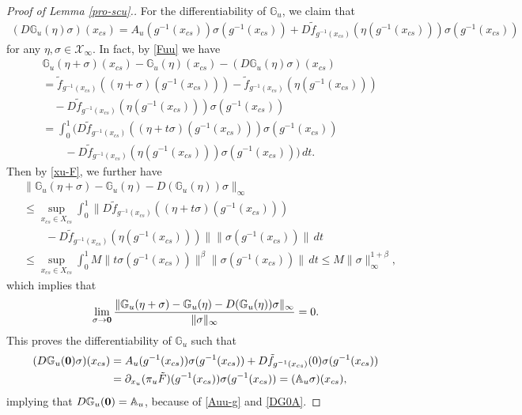 \documentclass[reqno]{amsart}
\numberwithin{equation}{section}
\begin{document}
\begin{proof}[Proof of Lemma {\rm \ref{pro-scu}}.]
For the differentiability of $\mathbb{G}_u$, we claim that
\begin{align*}
(D\mathbb{G}_u(\eta)\sigma) (x_{cs})
=A_u(g^{-1}(x_{cs}))\sigma(g^{-1}(x_{cs}))
+ D\tilde{f}_{g^{-1}(x_{cs})}(\eta(g^{-1}(x_{cs}))) \sigma(g^{-1}(x_{cs}))
\end{align*}
for any $\eta,\sigma\in \mathcal{X}_\infty$.
In fact, by \eqref{Fuu} we have
\begin{align*}
&\mathbb{G}_u(\eta+\sigma)(x_{cs}) - \mathbb{G}_u(\eta)(x_{cs}) -(D\mathbb{G}_u(\eta)\sigma)(x_{cs})
\\
& = \tilde{f}_{g^{-1}(x_{cs})}((\eta+\sigma)(g^{-1}(x_{cs})) ) - \tilde{f}_{g^{-1}(x_{cs})}(   \eta(g^{-1}(x_{cs})) )
\\
&\quad  - D\tilde{f}_{g^{-1}(x_{cs})}(\eta(g^{-1}(x_{cs}))) \sigma(g^{-1}(x_{cs}))
\\
& =\int_0^1 \Big( D\tilde{f}_{g^{-1}(x_{cs})}((\eta+t\sigma)(g^{-1}(x_{cs}))) \sigma(g^{-1}(x_{cs}))
\\
&\qquad  - D\tilde{f}_{g^{-1}(x_{cs})}(\eta(g^{-1}(x_{cs})))
    \sigma(g^{-1}(x_{cs})) \Big) \, dt.
\end{align*}
Then by  \eqref{xu-F}, we further have
\begin{align*}
&\| \mathbb{G}_u(\eta+\sigma) - \mathbb{G}_u(\eta) - D(\mathbb{G}_u(\eta))\sigma \|_\infty
\\
&\le \sup_{x_{cs}\in X_{cs}} \int_0^1
\big\| D\tilde{f}_{g^{-1}(x_{cs})}( (\eta+t\sigma)(g^{-1}(x_{cs})))
\\
&\qquad - D\tilde{f}_{g^{-1}(x_{cs})}(\eta(g^{-1}(x_{cs}))) \big\| \| \sigma(g^{-1}(x_{cs})) \|  \, dt
\\
&\le \sup_{x_{cs}\in X_{cs}} \int_0^1 M \|t \sigma(g^{-1}(x_{cs})) \|^{\beta}   \| \sigma(g^{-1}(x_{cs})) \|  \, dt \le M \|\sigma\|_\infty^{1+\beta},
\end{align*}
which implies that
$$
\lim_{\sigma\to {\bf 0}} \frac{\| \mathbb{G}_u(\eta+\sigma) - \mathbb{G}_u(\eta) - D(\mathbb{G}_u(\eta))\sigma \|_\infty}{\|\sigma\|_\infty} = 0.
$$
This proves the differentiability of $\mathbb{G}_u$ such that
\begin{align*}
(D\mathbb{G}_u({\bf 0})\sigma) (x_{cs})
&=A_u(g^{-1}(x_{cs}))\sigma(g^{-1}(x_{cs})) + D\tilde{f}_{g^{-1}(x_{cs})}(0) \sigma(g^{-1}(x_{cs}))
\nonumber\\
&=\partial_{x_u}(\pi_u\tilde F)(g^{-1}(x_{cs}))\sigma(g^{-1}(x_{cs}))=(\mathbb{A}_u \sigma)(x_{cs}),
\end{align*}
implying that $D\mathbb{G}_u({\bf 0})=\mathbb{A}_u$, because of \eqref{Auu-g}
and \eqref{DG0A}.


\end{proof}
\end{document}
